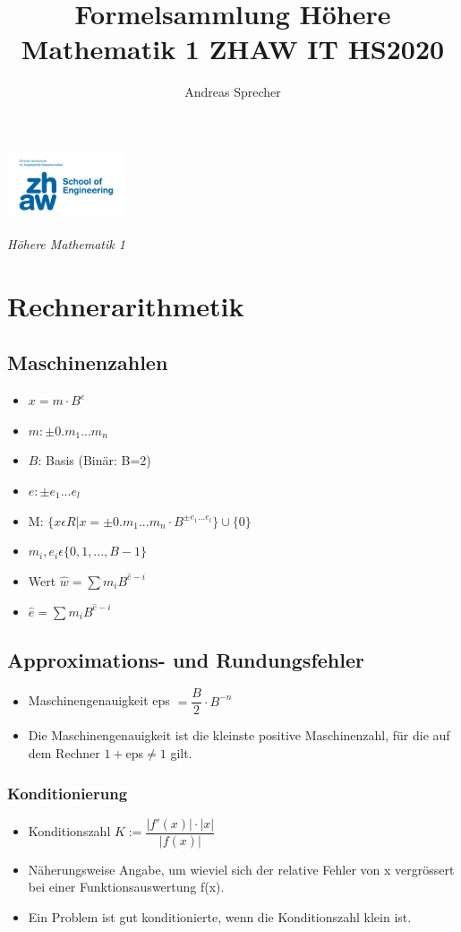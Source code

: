 \documentclass[8pt,a4paper]{scrartcl}
\title{Formelsammlung Höhere Mathematik 1 ZHAW IT HS2020}
\author{Andreas Sprecher}
\begin{document}
\begin{multicols*}{3}
\setlength{\columnseprule}{0.4pt}
    \parbox{4cm}{
        \includegraphics[height=2cm]{./img/Logo.jpeg}
    }
    \parbox{4cm}{
        \emph{\Large{Höhere Mathematik 1}}
    }
    \vspace{-2mm} 

	\section{Rechnerarithmetik}
		\subsection{Maschinenzahlen}
			\begin{itemize}\itemsep0pt				
				\item $x = m \cdot B^{e}$
				\item $m: \pm 0.m_{1}...m_{n}$
				\item $B$: Basis (Binär: B=2)
				\item $e: \pm e_{1}...e_{l}$
				\item M: $\{x\epsilon R | x = \pm 0.m_{1}...m_{n}\cdot B^{\pm e_{1}...e_{l}}\} \cup \{0\}$
				\item $m_{i}, e_{i}\epsilon\{0,1,..., B-1\}$	
				\item Wert $\hat{w} = \sum m_{i}B^{\hat{e}-i}$
				\item $\hat{e} = \sum m_{i}B^{\hat{e}-i}$
			\end{itemize}
		\subsection{Approximations- und Rundungsfehler}
			\begin{itemize}\itemsep0pt	
				\item Maschinengenauigkeit eps $=\dfrac{B}{2}\cdot B^{-n}$
				\item Die Maschinengenauigkeit ist die kleinste positive Maschinenzahl, für die auf dem Rechner $1 + $eps$  \neq 1$ gilt.
			\end{itemize}		
		
			\subsubsection{Konditionierung}
    				\begin{itemize}\itemsep0pt			
    					\item Konditionszahl $K:= \dfrac{|f'(x)|\cdot |x|}{|f(x)|} $
    					\item Näherungsweise Angabe, um wieviel sich der relative Fehler von x vergrössert bei einer Funktionsauswertung f(x).
    					\item Ein Problem ist gut konditionierte, wenn die Konditionszahl klein ist.


\end{itemize}
\end{multicols*}
\end{document}
